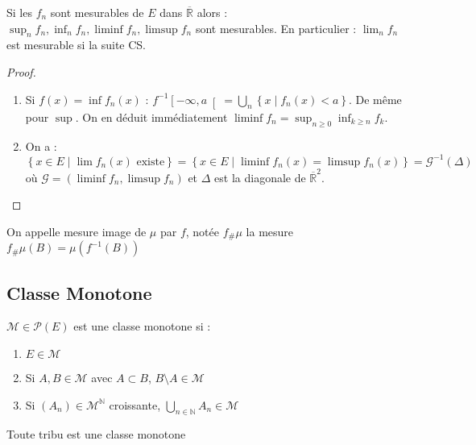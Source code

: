 \documentclass{cours}
\begin{document}
\begin{proposition}
    Si les $f_n$ sont mesurables de $E$ dans $\overline{\mathbb{R}}$ alors : $\sup_n f_n, \inf_n f_n, \liminf f_n, \limsup f_n$ sont mesurables.
    En particulier : $\lim_n f_n$ est mesurable si la suite CS.
\end{proposition}
\begin{proof}
    \begin{enumerate}
        \item Si $f(x) = \inf f_{n}(x)$ : $f^{-1}\left[-\infty, a\right[ = \bigcup_{n} \left\{x \mid f_{n}(x) < a\right\}$. De même pour $\sup$. On en déduit immédiatement $\liminf f_n = \sup_{n \geq 0} \inf_{k \geq n} f_{k}$.
        \item On a : $\left\{x\in E\mid \lim f_{n}(x) \text{ existe}\right\} = \left\{x \in E \mid \liminf f_{n}(x) = \limsup f_{n}(x)\right\} = \mathcal{G}^{-1}(\Delta)$ où $\mathcal{G} = (\liminf f_{n}, \limsup f_{n})$ et $\Delta$ est la diagonale de $\overline{\mathbb{R}}^{2}$.
    \end{enumerate}
\end{proof}
\begin{definition}
    On appelle mesure image de $\mu$ par $f$, notée $f_{\#}\mu$ la mesure $f_{\#}\mu(B) = \mu(f^{-1}(B))$
\end{definition}

\subsection{Classe Monotone}
\begin{definition}
    $\mathcal{M} \in \mathcal{P}(E)$ est une classe monotone si :
    \begin{enumerate}
        \item $E\in \mathcal{M}$
        \item Si $A, B \in \mathcal{M}$ avec $A\subset B$, $B \setminus A \in \mathcal{M}$
        \item Si $(A_{n}) \in \mathcal{M}^{\mathbb{N}}$ croissante, $\bigcup\limits_{n\in\mathbb{N}} A_{n} \in \mathcal{M}$
    \end{enumerate}
\end{definition}

\begin{remark}
    Toute tribu est une classe monotone
\end{remark}
\end{document}
